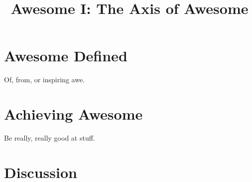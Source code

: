 \documentclass{article}
\begin{document}
\title{Awesome I: The Axis of Awesome}

\section{Awesome Defined}

Of, from, or inspiring awe.

\section{Achieving Awesome}

Be really, really good at stuff.

\section{Discussion}
\end{document}
